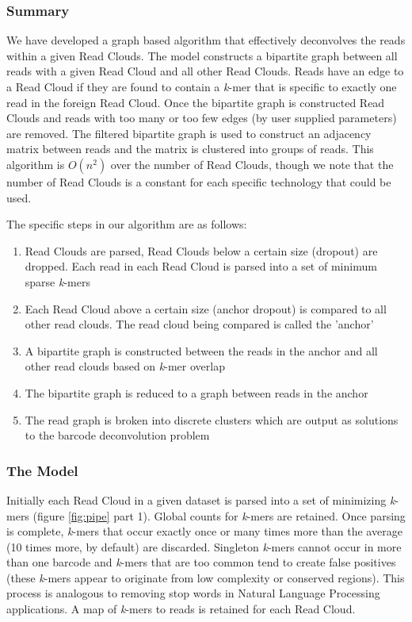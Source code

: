 \subsubsection*{Summary}
\label{algo}

We have developed a graph based algorithm that effectively deconvolves the reads within a given Read Clouds. The model constructs a bipartite graph between all reads with a given Read Cloud and all other Read Clouds. Reads have an edge to a Read Cloud if they are found to contain a \textit{k}-mer that is specific to exactly one read in the foreign Read Cloud. Once the bipartite graph is constructed Read Clouds and reads with too many or too few edges (by user supplied parameters) are removed. The filtered bipartite graph is used to construct an adjacency matrix between reads and the matrix is clustered into groups of reads. This algorithm is $O(n^2)$ over the number of Read Clouds, though we note that the number of Read Clouds is a constant for each specific technology that could be used. 

The specific steps in our algorithm are as follows:

\begin{enumerate}
\item Read Clouds are parsed, Read Clouds below a certain size (dropout) are dropped. Each read in each Read Cloud is parsed into a set of minimum sparse \textit{k}-mers
\item Each Read Cloud above a certain size (anchor dropout) is compared to all other read clouds. The read cloud being compared is called the 'anchor'
\item A bipartite graph is constructed between the reads in the anchor and all other read clouds based on \textit{k}-mer overlap
\item The bipartite graph is reduced to a graph between reads in the anchor
\item The read graph is broken into discrete clusters which are output as solutions to the barcode deconvolution problem
\end{enumerate}

\subsubsection*{The Model}

Initially each Read Cloud in a given dataset is parsed into a set of minimizing \textit{k}-mers (figure \ref{fig:pipe} part 1). Global counts for \textit{k}-mers are retained. Once parsing is complete, \textit{k}-mers that occur exactly once or many times more than the average (10 times more, by default) are discarded. Singleton \textit{k}-mers cannot occur in more than one barcode and \textit{k}-mers that are too common tend to create false positives (these \textit{k}-mers appear to originate from low complexity or conserved regions). This process is analogous to removing stop words in Natural Language Processing applications. A map of \textit{k}-mers to reads is retained for each Read Cloud.

